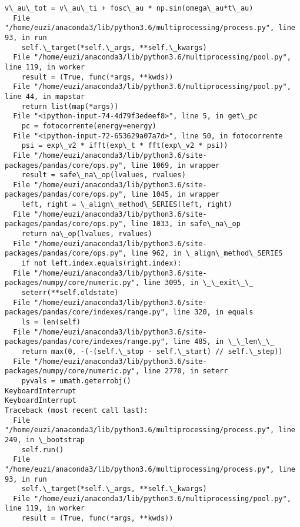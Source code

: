 \documentclass[11pt]{article}
\begin{document}
\begin{Verbatim}[commandchars=\\\{\}]
    v\_au\_tot = v\_au\_ti + fosc\_au * np.sin(omega\_au*t\_au)
  File "/home/euzi/anaconda3/lib/python3.6/multiprocessing/process.py", line 93, in run
    self.\_target(*self.\_args, **self.\_kwargs)
  File "/home/euzi/anaconda3/lib/python3.6/multiprocessing/pool.py", line 119, in worker
    result = (True, func(*args, **kwds))
  File "/home/euzi/anaconda3/lib/python3.6/multiprocessing/pool.py", line 44, in mapstar
    return list(map(*args))
  File "<ipython-input-74-4d79f3edeef8>", line 5, in get\_pc
    pc = fotocorrente(energy=energy)
  File "<ipython-input-72-653629a07a7d>", line 50, in fotocorrente
    psi = exp\_v2 * ifft(exp\_t * fft(exp\_v2 * psi))
  File "/home/euzi/anaconda3/lib/python3.6/site-packages/pandas/core/ops.py", line 1069, in wrapper
    result = safe\_na\_op(lvalues, rvalues)
  File "/home/euzi/anaconda3/lib/python3.6/site-packages/pandas/core/ops.py", line 1045, in wrapper
    left, right = \_align\_method\_SERIES(left, right)
  File "/home/euzi/anaconda3/lib/python3.6/site-packages/pandas/core/ops.py", line 1033, in safe\_na\_op
    return na\_op(lvalues, rvalues)
  File "/home/euzi/anaconda3/lib/python3.6/site-packages/pandas/core/ops.py", line 962, in \_align\_method\_SERIES
    if not left.index.equals(right.index):
  File "/home/euzi/anaconda3/lib/python3.6/site-packages/numpy/core/numeric.py", line 3095, in \_\_exit\_\_
    seterr(**self.oldstate)
  File "/home/euzi/anaconda3/lib/python3.6/site-packages/pandas/core/indexes/range.py", line 320, in equals
    ls = len(self)
  File "/home/euzi/anaconda3/lib/python3.6/site-packages/pandas/core/indexes/range.py", line 485, in \_\_len\_\_
    return max(0, -(-(self.\_stop - self.\_start) // self.\_step))
  File "/home/euzi/anaconda3/lib/python3.6/site-packages/numpy/core/numeric.py", line 2770, in seterr
    pyvals = umath.geterrobj()
KeyboardInterrupt
KeyboardInterrupt
Traceback (most recent call last):
  File "/home/euzi/anaconda3/lib/python3.6/multiprocessing/process.py", line 249, in \_bootstrap
    self.run()
  File "/home/euzi/anaconda3/lib/python3.6/multiprocessing/process.py", line 93, in run
    self.\_target(*self.\_args, **self.\_kwargs)
  File "/home/euzi/anaconda3/lib/python3.6/multiprocessing/pool.py", line 119, in worker
    result = (True, func(*args, **kwds))

    \end{Verbatim}
\end{document}
